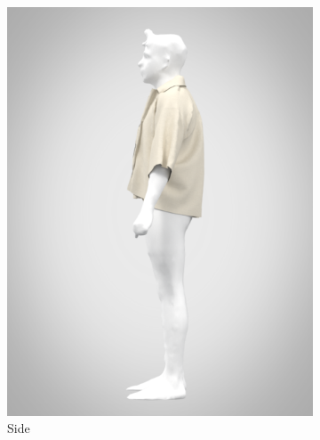 \begin{figure}[H]
\begin{subfigure}[b]{0.3\textwidth}
        \includegraphics[width=\textwidth]{Images/renderside.png}
        \caption{Side}
    \end{subfigure}
    \hfill
    \begin{subfigure}[b]{0.3\textwidth}
        \centering

\end{subfigure}
\end{figure}
